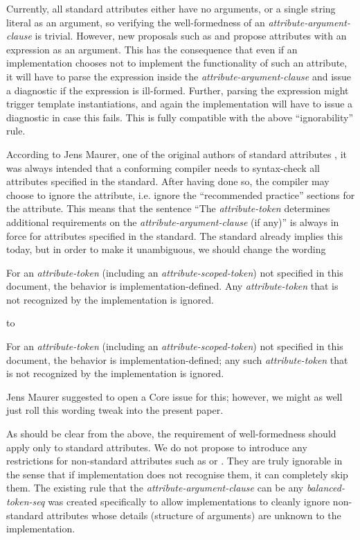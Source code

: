 Currently, all standard attributes either have no arguments, or a single string literal as an argument, so verifying the well-formedness of an  \emph{attribute-argument-clause} is trivial. However, new proposals such as  \cite{P1774R6} and  \cite{P1144R5} propose attributes with an expression as an argument. This has the consequence that even if an implementation chooses not to implement the functionality of such an attribute, it will have to parse the expression inside the \emph{attribute-argument-clause} and issue a diagnostic if the expression is ill-formed. Further, parsing the expression might trigger template instantiations, and again the implementation will have to issue a diagnostic in case this fails. This is fully compatible with the above ``ignorability'' rule.

According to Jens Maurer, one of the original authors of standard attributes \cite{N2761}, it was always intended that a conforming compiler needs to syntax-check all attributes specified in the standard.  After having done so, the compiler may choose to ignore the attribute, i.e. ignore the ``recommended practice'' sections for the attribute. This means that the sentence ``The \emph{attribute-token} determines additional requirements on the \emph{attribute-argument-clause} (if any)'' is always in force for attributes specified in the standard. The standard already implies this today, but in order to make it unambiguous, we should change the wording
\begin{adjustwidth}{0.5cm}{0.5cm}
For an \emph{attribute-token} (including an \emph{attribute-scoped-token})  not specified in this document, the behavior is implementation-defined. Any \emph{attribute-token} that is not recognized by the implementation is ignored.
\end{adjustwidth}
to
\begin{adjustwidth}{0.5cm}{0.5cm}
For an \emph{attribute-token} (including an \emph{attribute-scoped-token})  not specified in this document, the behavior is implementation-defined; any such \emph{attribute-token} that is not recognized by the implementation is ignored.
\end{adjustwidth}

Jens Maurer suggested to open a Core issue for this; however, we might as well just roll this wording tweak into the present paper.

As should be clear from the above, the requirement of well-formedness should apply only to standard attributes. We do not propose to introduce any restrictions for non-standard attributes such as  or . They are truly ignorable in the sense that if implementation does not recognise them, it can completely skip them. The existing rule that the \emph{attribute-argument-clause} can be any \emph{balanced-token-seq} was created specifically to allow implementations to cleanly ignore non-standard attributes whose details (structure of arguments) are unknown to the implementation.  

